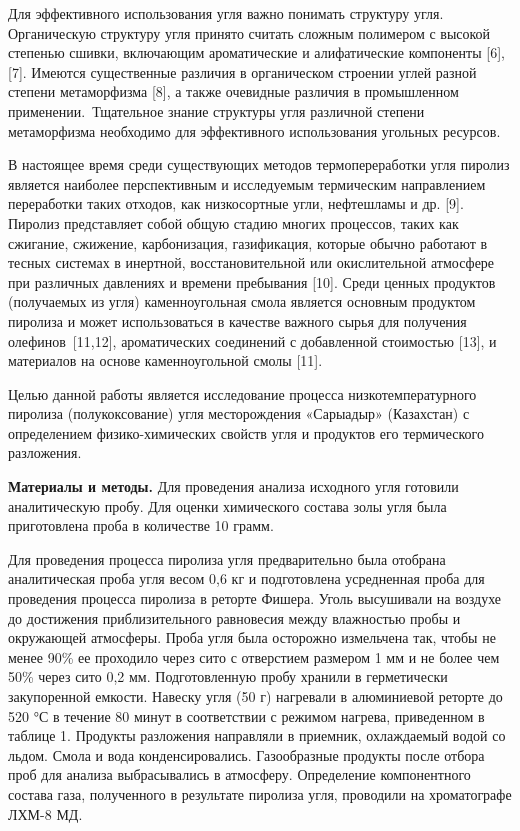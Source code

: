 Для эффективного использования угля важно понимать структуру угля.
Органическую структуру угля принято считать сложным полимером с высокой
степенью сшивки, включающим ароматические и алифатические компоненты
{[}6{]}, {[}7{]}. Имеются существенные различия в органическом строении
углей разной степени метаморфизма {[}8{]}, а также очевидные различия в
промышленном применении.~Тщательное знание структуры угля различной
степени метаморфизма необходимо для эффективного использования угольных
ресурсов.

В настоящее время среди существующих методов термопереработки угля
пиролиз является наиболее перспективным и исследуемым термическим
направлением переработки таких отходов, как низкосортные угли,
нефтешламы и др. {[}9{]}. Пиролиз представляет собой общую стадию многих
процессов, таких как сжигание, сжижение, карбонизация, газификация,
которые обычно работают в тесных системах в инертной, восстановительной
или окислительной атмосфере при различных давлениях и времени пребывания
{[}10{]}. Среди ценных продуктов (получаемых из угля) каменноугольная
смола является основным продуктом пиролиза и может использоваться в
качестве важного сырья для получения олефинов~{[}11,12{]}, ароматических
соединений с добавленной стоимостью {[}13{]}, и материалов на основе
каменноугольной смолы {[}11{]}.~

Целью данной работы является исследование процесса низкотемпературного
пиролиза (полукоксование) угля месторождения «Сарыадыр» (Казахстан) с
определением физико-химических свойств угля и продуктов его термического
разложения.

{\bfseries Материалы и методы.} Для проведения анализа исходного угля
готовили аналитическую пробу. Для оценки химического состава золы угля
была приготовлена проба в количестве 10 грамм.

Для проведения процесса пиролиза угля предварительно была отобрана
аналитическая проба угля весом 0,6 кг и подготовлена усредненная проба
для проведения процесса пиролиза в реторте Фишера. Уголь высушивали на
воздухе до достижения приблизительного равновесия между влажностью пробы
и окружающей атмосферы. Проба угля была осторожно измельчена так, чтобы
не менее 90\% ее проходило через сито с отверстием размером 1 мм и не
более чем 50\% через сито 0,2 мм. Подготовленную пробу хранили в
герметически закупоренной емкости. Навеску угля (50 г) нагревали в
алюминиевой реторте до 520 °С в течение 80 минут в соответствии с
режимом нагрева, приведенном в таблице 1. Продукты разложения направляли
в приемник, охлаждаемый водой со льдом. Смола и вода конденсировались.
Газообразные продукты после отбора проб для анализа выбрасывались в
атмосферу. Определение компонентного состава газа, полученного в
результате пиролиза угля, проводили на хроматографе ЛХМ-8 МД.

